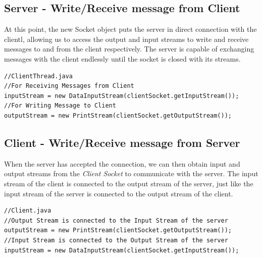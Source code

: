 \documentclass[a4paper,11pt]{article}
\begin{document}
\subsection{Server - Write/Receive message from Client}
At this point, the new Socket object puts the server in direct connection with the clientl, allowing us to access the output and input streams to write and receive messages to and from the client respectively. The server is capable of exchanging messages with the client endlessly until the socket is closed with its streams.
\begin{mdframed}[backgroundcolor=light-gray, roundcorner=30pt,leftmargin=1, rightmargin=1, innerleftmargin=5, innertopmargin=-3,innerbottommargin=5, outerlinewidth=1, linecolor=light-gray]
\begin{lstlisting}
//ClientThread.java
//For Receiving Messages from Client
inputStream = new DataInputStream(clientSocket.getInputStream());
//For Writing Message to Client
outputStream = new PrintStream(clientSocket.getOutputStream());
\end{lstlisting}
\end{mdframed}

\subsection{Client - Write/Receive message from Server}
When the server has accepted the connection, we can then obtain input and output streams from the \textit{Client Socket} to communicate with the server. The input stream of the client is connected to the output stream of the server, just like the input stream of the server is connected to the output stream of the client.
\begin{mdframed}[backgroundcolor=light-gray, roundcorner=30pt,leftmargin=1, rightmargin=1, innerleftmargin=5, innertopmargin=-3,innerbottommargin=5, outerlinewidth=1, linecolor=light-gray]
\begin{lstlisting}
//Client.java
//Output Stream is connected to the Input Stream of the server
outputStream = new PrintStream(clientSocket.getOutputStream());
//Input Stream is connected to the Output Stream of the server
inputStream = new DataInputStream(clientSocket.getInputStream());
\end{lstlisting}
\end{mdframed}
\end{document}
